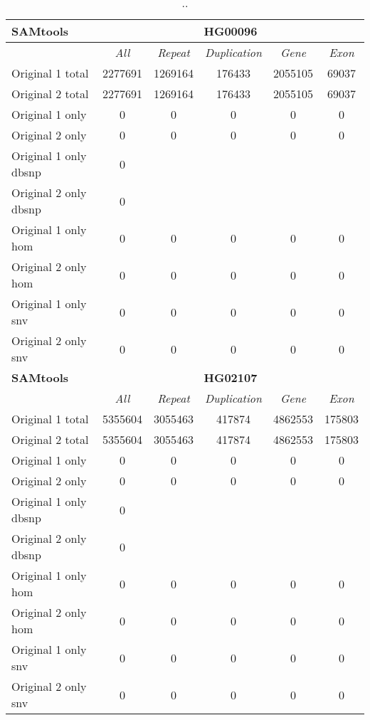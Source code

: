 \begin{table}[htb]
\begin{center}
\begin{tabular}{|l|c||c|c|c|c|}
\hline
{\bf SAMtools} & \multicolumn{5}{|c|}{\bf HG00096} \\
\hline
\cline{2-6}
{\bf} & {\it All} & {\it Repeat} & {\it Duplication} & {\it Gene} & {\it Exon} \\
\hline
Original 1 total & 2277691 & 1269164 & 176433 & 2055105 & 69037\\ 
\hline
Original 2 total & 2277691 & 1269164 & 176433 & 2055105 & 69037\\ 
\hline
Original 1 only & 0 & 0 & 0 & 0 & 0\\ 
\hline
Original 2 only & 0 & 0 & 0 & 0 & 0\\ 
\hline
Original 1 only dbsnp & 0 &  &  &  & \\ 
\hline
Original 2 only dbsnp & 0 &  &  &  & \\ 
\hline
Original 1 only hom & 0 & 0 & 0 & 0 & 0\\ 
\hline
Original 2 only hom & 0 & 0 & 0 & 0 & 0\\ 
\hline
Original 1 only snv & 0 & 0 & 0 & 0 & 0\\ 
\hline
Original 2 only snv & 0 & 0 & 0 & 0 & 0\\ 
\hline
\hline
{\bf SAMtools} & \multicolumn{5}{|c|}{\bf HG02107} \\
\hline
\cline{2-6}
{\bf} & {\it All} & {\it Repeat} & {\it Duplication} & {\it Gene} & {\it Exon} \\
\hline
Original 1 total & 5355604 & 3055463 & 417874 & 4862553 & 175803\\ 
\hline
Original 2 total & 5355604 & 3055463 & 417874 & 4862553 & 175803\\ 
\hline
Original 1 only & 0 & 0 & 0 & 0 & 0\\ 
\hline
Original 2 only & 0 & 0 & 0 & 0 & 0\\ 
\hline
Original 1 only dbsnp & 0 &  &  &  & \\ 
\hline
Original 2 only dbsnp & 0 &  &  &  & \\ 
\hline
Original 1 only hom & 0 & 0 & 0 & 0 & 0\\ 
\hline
Original 2 only hom & 0 & 0 & 0 & 0 & 0\\ 
\hline
Original 1 only snv & 0 & 0 & 0 & 0 & 0\\ 
\hline
Original 2 only snv & 0 & 0 & 0 & 0 & 0\\ 
\hline
\end{tabular}
\end{center}
\caption{ .. }
\label{tab:orig-vs-orig2-samtools}
\end{table}

